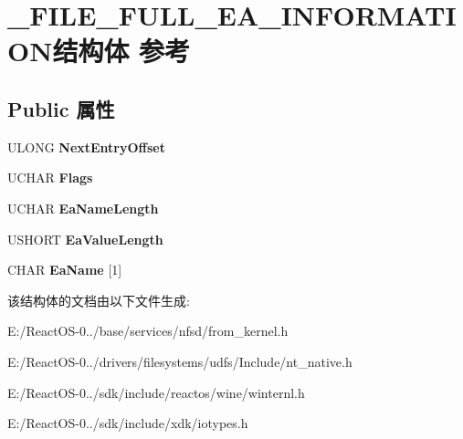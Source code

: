 \hypertarget{struct___f_i_l_e___f_u_l_l___e_a___i_n_f_o_r_m_a_t_i_o_n}{}\section{\+\_\+\+F\+I\+L\+E\+\_\+\+F\+U\+L\+L\+\_\+\+E\+A\+\_\+\+I\+N\+F\+O\+R\+M\+A\+T\+I\+O\+N结构体 参考}
\label{struct___f_i_l_e___f_u_l_l___e_a___i_n_f_o_r_m_a_t_i_o_n}
\subsection*{Public 属性}
\begin{DoxyCompactItemize}
\item 
\mbox{\label{struct___f_i_l_e___f_u_l_l___e_a___i_n_f_o_r_m_a_t_i_o_n_a1fc2ae82d1dcd82da46c776b49e0b780}} 
U\+L\+O\+NG {\bfseries Next\+Entry\+Offset}
\item 
\mbox{\label{struct___f_i_l_e___f_u_l_l___e_a___i_n_f_o_r_m_a_t_i_o_n_a9ff47c773c2a08dd165085b47d115d7a}} 
U\+C\+H\+AR {\bfseries Flags}
\item 
\mbox{\label{struct___f_i_l_e___f_u_l_l___e_a___i_n_f_o_r_m_a_t_i_o_n_a4f065116071958fc572ec5c262b3e4fd}} 
U\+C\+H\+AR {\bfseries Ea\+Name\+Length}
\item 
\mbox{\label{struct___f_i_l_e___f_u_l_l___e_a___i_n_f_o_r_m_a_t_i_o_n_a45d30df5ffd707ca8b65ade373e4c369}} 
U\+S\+H\+O\+RT {\bfseries Ea\+Value\+Length}
\item 
\mbox{\label{struct___f_i_l_e___f_u_l_l___e_a___i_n_f_o_r_m_a_t_i_o_n_a79fec5d12df8e50a8dd4f79c53fc6cd7}} 
C\+H\+AR {\bfseries Ea\+Name} \mbox{[}1\mbox{]}
\end{DoxyCompactItemize}


该结构体的文档由以下文件生成\+:\begin{DoxyCompactItemize}
\item 
E\+:/\+React\+O\+S-\/0../base/services/nfsd/from\+\_\+kernel.\+h\item 
E\+:/\+React\+O\+S-\/0../drivers/filesystems/udfs/\+Include/nt\+\_\+native.\+h\item 
E\+:/\+React\+O\+S-\/0../sdk/include/reactos/wine/winternl.\+h\item 
E\+:/\+React\+O\+S-\/0../sdk/include/xdk/iotypes.\+h\end{DoxyCompactItemize}
